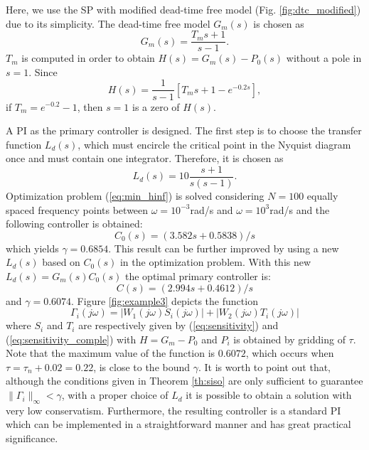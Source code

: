 \documentclass[default]{svmult}
\begin{document}
Here, we use the SP with modified dead-time free model (Fig. \ref{fig:dtc_modified}) due to its simplicity. The dead-time free model $G_m(s)$ is chosen as
\begin{equation}
G_m(s)=\frac{T_ms+1}{s-1}.
\end{equation}
$T_m$ is computed in order to obtain $H(s)=G_m(s)-P_0(s)$ without a pole in $s=1$.
Since 
\begin{equation}
H(s)=\frac{1}{s-1}[T_ms+1-e^{-0.2s}],
\end{equation}
if $T_m=e^{-0.2}-1$, then $s=1$ is a zero of $H(s)$.

A PI as the primary controller is designed. The first step is to choose the transfer function $L_d(s)$, which must encircle the critical point in the Nyquist diagram once and must contain one integrator. Therefore, it is chosen as
\begin{equation}
L_d(s)=10\frac{s+1}{s(s-1)}.
\end{equation}
Optimization problem (\ref{eq:min_hinf}) is solved considering $N=100$ equally spaced frequency points between $\omega=10^{-3}$rad/s and $\omega=10^{3}$rad/s and the following controller is obtained:
\begin{equation}
C_{0}(s)=(3.582 s + 0.5838)/s
\end{equation}  
which yields $\gamma= 0.6854$. This result can be further improved by using a new $L_d(s)$ based on $C_0(s)$ in the optimization problem. With this new $L_d(s)=G_m(s)C_0(s)$ the optimal primary controller is: 
\begin{equation}
C(s)=(2.994 s + 0.4612)/s
\end{equation}  
and $\gamma=0.6074$. Figure \ref{fig:example3} depicts the function 
$$\Gamma_i(j\omega)=|W_1(j\omega)S_i(j\omega)|+|W_2(j\omega)T_i(j\omega)|$$
where $S_i$ and $T_i$ are respectively given by (\ref{eq:sensitivity}) and (\ref{eq:sensitivity_comple}) with $H=G_m-P_0$ and $P_i$ is obtained by gridding of $\tau$. Note that the maximum value of the function is $0.6072$, which occurs when $\tau=\tau_n+0.02=0.22$, is close to the bound $\gamma$. It is worth to point out that, although the conditions given in Theorem \ref{th:siso} are only sufficient to guarantee $\| \Gamma_i \|_{\infty}<\gamma$, with a proper choice of $L_d$ it is possible to obtain 
a solution with very low conservatism. Furthermore, the resulting controller is a standard PI 
which can be implemented in a straightforward manner and has great practical significance.
\end{document}
